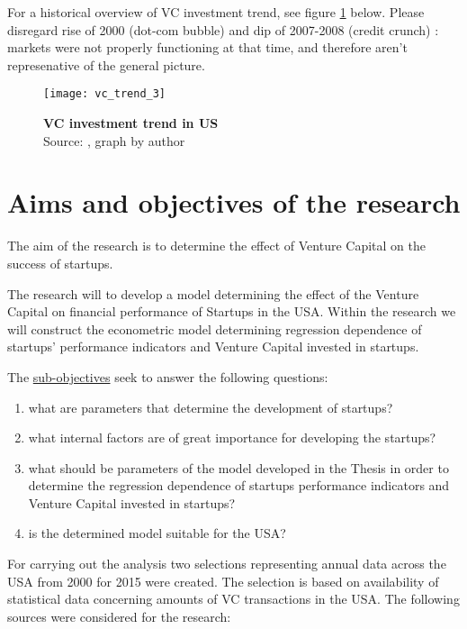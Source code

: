 For a historical overview of VC investment trend, see figure \ref{fig:vc_trend} below. Please disregard rise of 2000 (dot-com bubble) and dip of 2007-2008 (credit crunch) : markets were not properly functioning at that time, and therefore aren't represenative of the general picture.

\begin{figure}[ht]
    \centering
    \texttt{[image: vc\_trend\_3]}
    \caption{ \textbf{VC investment trend in US}\\Source: \parencite[][]{moneytree}, graph by author}
    \label{fig:vc_trend}
\end{figure}

\section{Aims and objectives of the research}
The aim of the research is to determine the effect of Venture Capital on the success of startups.

The research will to develop a model determining the effect of the Venture Capital on financial performance of Startups in the USA. Within the research we will construct the econometric model determining regression dependence of startups' performance indicators and Venture Capital invested in startups.

The \underline{sub-objectives} seek to answer the following questions:
\begin{enumerate}
    \item what are parameters that determine the development of startups?
    \item what internal factors are of great importance for developing the startups?
    \item what should be parameters of the model developed in the Thesis in order to determine the regression dependence of startups performance indicators and Venture Capital invested in startups?
    \item is the determined model suitable for the USA?
\end{enumerate}


For carrying out the analysis two selections representing annual data across the USA from 2000 for 2015 were created. The selection is based on availability of statistical data concerning amounts of VC transactions in the USA. 
The following sources were considered for the research:

